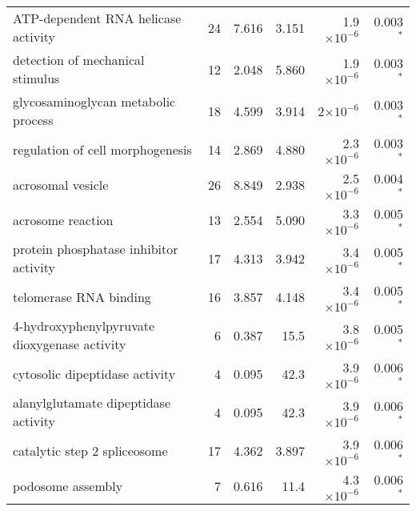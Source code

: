 \begin{longtable}{|l|r|r|r|r|r|}
               ATP-dependent RNA helicase activity &                      24 &                   7.616 &      3.151 &  1.9$\times 10^{-6}$ &                 0.003$\bm{^*}$ \\
                  detection of mechanical stimulus &                      12 &                   2.048 &      5.860 &  1.9$\times 10^{-6}$ &                 0.003$\bm{^*}$ \\
               glycosaminoglycan metabolic process &                      18 &                   4.599 &      3.914 &    2$\times 10^{-6}$ &                 0.003$\bm{^*}$ \\
                  regulation of cell morphogenesis &                      14 &                   2.869 &      4.880 &  2.3$\times 10^{-6}$ &                 0.003$\bm{^*}$ \\
                                 acrosomal vesicle &                      26 &                   8.849 &      2.938 &  2.5$\times 10^{-6}$ &                 0.004$\bm{^*}$ \\
                                 acrosome reaction &                      13 &                   2.554 &      5.090 &  3.3$\times 10^{-6}$ &                 0.005$\bm{^*}$ \\
            protein phosphatase inhibitor activity &                      17 &                   4.313 &      3.942 &  3.4$\times 10^{-6}$ &                 0.005$\bm{^*}$ \\
                            telomerase RNA binding &                      16 &                   3.857 &      4.148 &  3.4$\times 10^{-6}$ &                 0.005$\bm{^*}$ \\
      4-hydroxyphenylpyruvate dioxygenase activity &                       6 &                   0.387 &       15.5 &  3.8$\times 10^{-6}$ &                 0.005$\bm{^*}$ \\
                    cytosolic dipeptidase activity &                       4 &                   0.095 &       42.3 &  3.9$\times 10^{-6}$ &                 0.006$\bm{^*}$ \\
              alanylglutamate dipeptidase activity &                       4 &                   0.095 &       42.3 &  3.9$\times 10^{-6}$ &                 0.006$\bm{^*}$ \\
                      catalytic step 2 spliceosome &                      17 &                   4.362 &      3.897 &  3.9$\times 10^{-6}$ &                 0.006$\bm{^*}$ \\
                                 podosome assembly &                       7 &                   0.616 &       11.4 &  4.3$\times 10^{-6}$ &                 0.006$\bm{^*}$ \\

\end{longtable}
